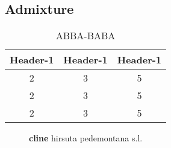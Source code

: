 \subsection{Admixture}

\begin{wraptable}{r}{5.5cm}
\begin{tabular}{ccc}\\\toprule  
Header-1 & Header-1 & Header-1 \\\midrule
2 &3 & 5\\  \midrule
2 &3 & 5\\  \midrule
2 &3 & 5\\  \bottomrule
\end{tabular}
\caption{ABBA-BABA}
\label{ABBA}
\end{wraptable} 

\begin{wrapfigure}{r}{0.30\textwidth}
	\vspace{-40pt}
	\begin{center}
	\end{center}
	\vspace{-20pt}
	\caption{\textbf{cline} hirsuta pedemontana s.l.}
    \label{cline}
\end{wrapfigure}

